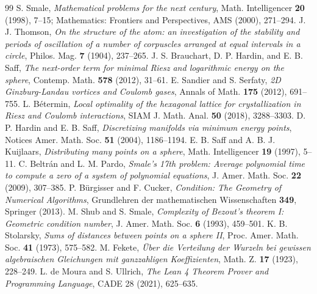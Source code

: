 \documentclass[11pt,a4paper]{article}
\theoremstyle{definition}
\begin{document}
\begin{thebibliography}{99}
 S. Smale, \textit{Mathematical problems for the next century}, Math. Intelligencer \textbf{20} (1998), 7--15; Mathematics: Frontiers and Perspectives, AMS (2000), 271--294.
 J. J. Thomson, \textit{On the structure of the atom: an investigation of the stability and periods of oscillation of a number of corpuscles arranged at equal intervals in a circle}, Philos. Mag. \textbf{7} (1904), 237--265.
 J. S. Brauchart, D. P. Hardin, and E. B. Saff, \textit{The next-order term for minimal Riesz and logarithmic energy on the sphere}, Contemp. Math. \textbf{578} (2012), 31--61.
 E. Sandier and S. Serfaty, \textit{2D Ginzburg-Landau vortices and Coulomb gases}, Annals of Math. \textbf{175} (2012), 691--755.
 L. B{\'e}termin, \textit{Local optimality of the hexagonal lattice for crystallization in Riesz and Coulomb interactions}, SIAM J. Math. Anal. \textbf{50} (2018), 3288--3303.
 D. P. Hardin and E. B. Saff, \textit{Discretizing manifolds via minimum energy points}, Notices Amer. Math. Soc. \textbf{51} (2004), 1186--1194.
 E. B. Saff and A. B. J. Kuijlaars, \textit{Distributing many points on a sphere}, Math. Intelligencer \textbf{19} (1997), 5--11.
 C. Beltr{\'a}n and L. M. Pardo, \textit{Smale's 17th problem: Average polynomial time to compute a zero of a system of polynomial equations}, J. Amer. Math. Soc. \textbf{22} (2009), 307--385.
 P. Bürgisser and F. Cucker, \textit{Condition: The Geometry of Numerical Algorithms}, Grundlehren der mathematischen Wissenschaften \textbf{349}, Springer (2013).
 M. Shub and S. Smale, \textit{Complexity of Bezout's theorem I: Geometric condition number}, J. Amer. Math. Soc. \textbf{6} (1993), 459--501.
 K. B. Stolarsky, \textit{Sums of distances between points on a sphere II}, Proc. Amer. Math. Soc. \textbf{41} (1973), 575--582.
 M. Fekete, \textit{{\"U}ber die Verteilung der Wurzeln bei gewissen algebraischen Gleichungen mit ganzzahligen Koeffizienten}, Math. Z. \textbf{17} (1923), 228--249.
 L. de Moura and S. Ullrich, \textit{The Lean 4 Theorem Prover and Programming Language}, CADE 28 (2021), 625--635.
\end{thebibliography}
\end{document}
